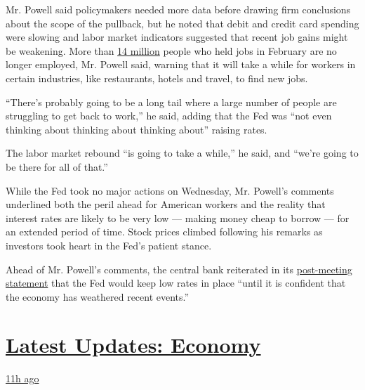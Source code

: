 Mr. Powell said policymakers needed more data before drawing firm
conclusions about the scope of the pullback, but he noted that debit and
credit card spending were slowing and labor market indicators suggested
that recent job gains might be weakening. More than
\href{https://fred.stlouisfed.org/series/PAYEMS\#:~:text=Notes\%3A,and\%20the\%20unincorporated\%20self\%2Demployed.}{14
million} people who held jobs in February are no longer employed, Mr.
Powell said, warning that it will take a while for workers in certain
industries, like restaurants, hotels and travel, to find new jobs.

``There's probably going to be a long tail where a large number of
people are struggling to get back to work,'' he said, adding that the
Fed was ``not even thinking about thinking about thinking about''
raising rates.

The labor market rebound ``is going to take a while,'' he said, and
``we're going to be there for all of that.''

While the Fed took no major actions on Wednesday, Mr. Powell's comments
underlined both the peril ahead for American workers and the reality
that interest rates are likely to be very low --- making money cheap to
borrow --- for an extended period of time. Stock prices climbed
following his remarks as investors took heart in the Fed's patient
stance.

Ahead of Mr. Powell's comments, the central bank reiterated in its
\href{https://www.federalreserve.gov/newsevents/pressreleases/monetary20200729a.htm}{post-meeting
statement} that the Fed would keep low rates in place ``until it is
confident that the economy has weathered recent events.''

\hypertarget{latest-updates-economy}{%
\section{\texorpdfstring{\href{https://www.nytimes3xbfgragh.onion/live/2020/08/03/business/stock-market-today-coronavirus?action=click\&pgtype=Article\&state=default\&region=MAIN_CONTENT_1\&context=storylines_live_updates}{Latest
Updates:
Economy}}{Latest Updates: Economy}}\label{latest-updates-economy}}

\href{https://www.nytimes3xbfgragh.onion/live/2020/08/03/business/stock-market-today-coronavirus?action=click\&pgtype=Article\&state=default\&region=MAIN_CONTENT_1\&context=storylines_live_updates\#the-chicago-fed-president-says-its-up-to-congress-to-save-the-economy}{11h
ago}

